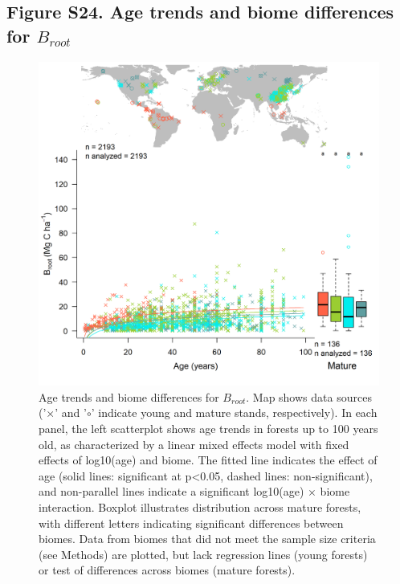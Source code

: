 \documentclass[
]{article}
\begin{document}
\newpage

\hypertarget{figure-s24.-age-trends-and-biome-differences-for-b_root}{%
\subsection{\texorpdfstring{Figure S24. Age trends and biome differences
for
\(B_{root}\)}{Figure S24. Age trends and biome differences for B\_\{root\}}}\label{figure-s24.-age-trends-and-biome-differences-for-b_root}}

\begin{figure}[H]

{\centering \includegraphics[width=1\linewidth]{tables_figures/age_trends/biomass_root_with_map} 

}

\caption{Age trends and biome differences for $B_{root}$. Map shows data sources ('$\times$' and '$\circ$' indicate young and mature stands, respectively). In each panel, the left scatterplot shows age trends in forests up to 100 years old, as characterized by a linear mixed effects model with fixed effects of log10(age) and biome. The fitted line indicates the effect of age (solid lines: significant at p<0.05, dashed lines: non-significant), and non-parallel lines indicate a significant log10(age) $\times$ biome interaction. Boxplot illustrates distribution across mature forests, with different letters indicating significant differences between biomes. Data from biomes that did not meet the sample size criteria (see Methods) are plotted, but lack regression lines (young forests) or test of differences across biomes (mature forests).}\label{fig:unnamed-chunk-27}
\end{figure}
\end{document}
